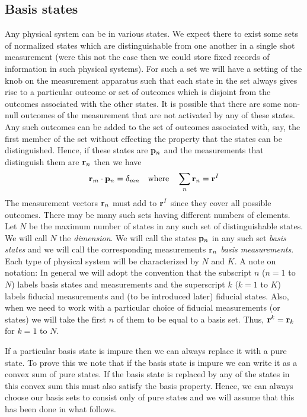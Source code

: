 \documentclass[10pt,twocolumn]{article}
\begin{document}
\subsection{Basis states}

Any physical system can be in various states.  We expect there to exist
some sets of normalized states which are distinguishable from one
another in a single shot measurement (were this not the case then we
could store fixed records of information in such physical systems).
For such a
set we will have a setting of the knob on the measurement apparatus such
that each state in the set always gives rise to a particular outcome or
set of outcomes which is disjoint from the outcomes associated with the other
states.  It is possible that there are some non-null outcomes of the
measurement that are not activated by any of these states.  Any such
outcomes can be added to the set of outcomes associated with, say, the
first member of the set without effecting the property that the states
can be distinguished.
Hence, if these states are ${\bf p}_n$ and the measurements that distinguish
them are ${\bf r}_n$ then we have
\begin{equation}
{\bf r}_m \cdot {\bf p}_n =\delta_{mn} \quad {\rm where}\quad
\sum_{n}{\bf r}_n = {\bf r}^I
\end{equation}
The measurement vectors ${\bf r}_n$ must add to ${\bf r}^I$ since they
cover all possible outcomes.  There may be
many such sets having different numbers of elements.  Let $N$ be the
maximum number of states in any such set of distinguishable states.  We
will call $N$ the {\it dimension}.  We will call the states ${\bf p}_n$
in any such set {\it basis states} and we will call the corresponding
measurements ${\bf r}_n$ {\it basis measurements}. Each type of physical
system will be characterized by $N$ and $K$.
A note on notation: In general we will adopt the convention that the
subscript $n$ ($n=1$ to $N$) labels basis states and measurements and
the superscript
$k$ ($k=1$ to $K$) labels fiducial measurements and (to be introduced
later) fiducial states.  Also, when we need to work
with a particular choice of fiducial measurements (or states) we will take the
first $n$ of them to be equal to a basis set. Thus, ${\bf
r}^k={\bf r}_k$ for $k=1$ to $N$.

If a particular basis state is impure then we can always replace it with
a pure state.  To prove this we note that if the basis state is impure
we can write it as a convex sum of pure states. If the basis state is
replaced by any of the states in this convex sum this must also satisfy
the basis property.  Hence, we can always choose our basis sets to
consist only of pure states and we will assume that this has been done
in what follows.
\end{document}
